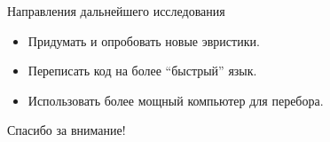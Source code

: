 \documentclass{beamer}
\begin{document}
\begin{frame}{Направления дальнейшего исследования}

\begin{itemize}
\item Придумать и опробовать новые эвристики.
\item Переписать код на более ``быстрый'' язык.
\item Использовать более мощный компьютер для перебора.
\end{itemize}

\end{frame}


\begin{frame}
\huge{\centerline{Спасибо за внимание!}}
\end{frame}
\end{document}
